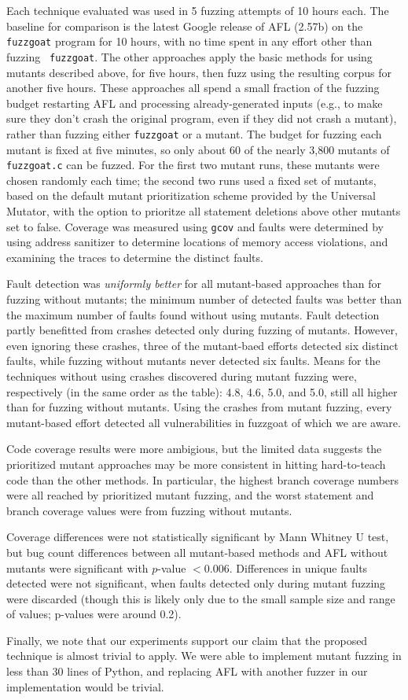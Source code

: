 Each
technique evaluated was used in 5 fuzzing attempts of 10 hours each.  The
baseline for comparison is the latest Google release of  AFL (2.57b) on the {\tt fuzzgoat} program for 10
hours, with no time spent in any effort other than fuzzing {\tt
  fuzzgoat}.  The other approaches apply the basic methods for using
mutants described above, for five hours, then fuzz using the resulting
corpus for another five hours.  These approaches all spend a small
fraction of the fuzzing budget restarting AFL and processing
already-generated inputs (e.g., to make sure they don't crash the
original program, even if they did not crash a mutant), rather than
fuzzing either {\tt fuzzgoat} or a mutant.  The budget for fuzzing
each mutant is fixed at five minutes, so only about 60 of the nearly
3,800 mutants of {\tt fuzzgoat.c} can be fuzzed.  For the first two
mutant runs, these mutants were chosen randomly each time; the second
two runs used a fixed set of mutants, based on the default mutant
prioritization scheme provided by the Universal Mutator, with the option to prioritze all statement deletions above other mutants set to false.  Coverage was measured using {\tt gcov} and faults were determined by using address sanitizer to determine locations of memory access violations, and examining the traces to determine the distinct faults.

Fault
detection was \emph{uniformly better} for all mutant-based approaches than
for fuzzing without mutants; the minimum number of detected faults was
better than the maximum number of faults found without using mutants.  Fault detection partly benefitted from crashes detected only during fuzzing of mutants.  However, even ignoring these crashes, three of the mutant-baed efforts detected six distinct faults, while fuzzing without mutants never detected six faults.  Means for the techniques without using crashes discovered during mutant fuzzing were, respectively (in the same order as the table): 4.8, 4.6, 5.0, and 5.0, still all higher than for fuzzing without mutants.  Using the crashes from mutant fuzzing, every mutant-based effort detected all vulnerabilities in fuzzgoat of which we are aware.


Code coverage results were more ambigious, but the limited data
suggests the prioritized mutant approaches may be more consistent in
hitting hard-to-teach code than the other methods.  In particular, the highest branch coverage numbers were all reached by prioritized mutant fuzzing, and the worst statement and branch coverage values were from fuzzing without mutants.

Coverage differences were not statistically significant by Mann
Whitney U test, but bug count differences between all mutant-based methods and AFL
without mutants were significant with $p$-value $< 0.006$.  Differences in unique faults detected were not significant, when faults detected only during mutant fuzzing were discarded (though this is likely only due to the small sample size and range of values; p-values were around 0.2).

Finally, we note that our experiments support our claim that the proposed technique is almost trivial to apply. We were able to implement mutant fuzzing in less than 30 lines of Python, and replacing AFL with another fuzzer in our implementation would be trivial.
